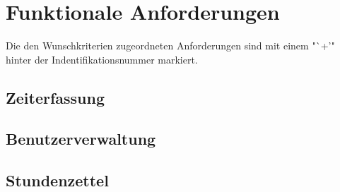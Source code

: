\section{Funktionale Anforderungen}

Die den Wunschkriterien zugeordneten Anforderungen sind mit einem "`+'" hinter der Indentifikationsnummer markiert.

\subsection{Zeiterfassung}

\subsection{Benutzerverwaltung}

\subsection{Stundenzettel}

%
